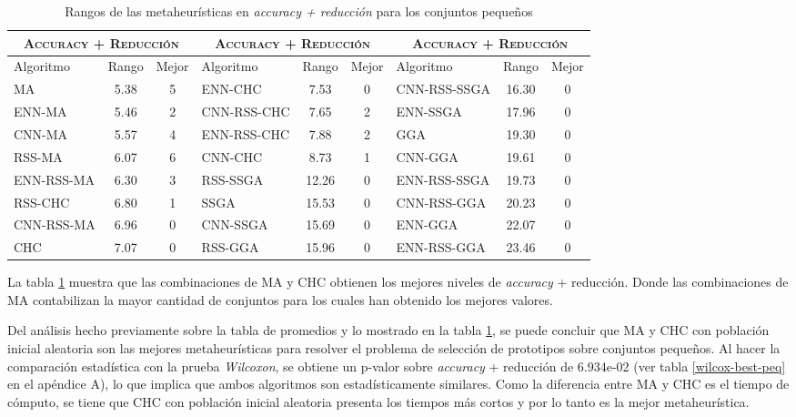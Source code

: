 \begin{table}[h!]
\centering
\begin{adjustbox}{max width =\textwidth}
\begin{tabular}{l c c|l c c|l c c}
\hline
\multicolumn{3}{c|}{\textsc{Accuracy + Reducción}}
	& \multicolumn{3}{c}{\textsc{Accuracy + Reducción}}
	& \multicolumn{3}{c}{\textsc{Accuracy + Reducción}} \\
\hline
Algoritmo & Rango & Mejor & Algoritmo & Rango & Mejor & Algoritmo & Rango & Mejor \\
\hline
\hline


MA           & 5.38  & 5 & ENN-CHC      & 7.53  & 0 & CNN-RSS-SSGA & 16.30 & 0  \\
ENN-MA       & 5.46  & 2 & CNN-RSS-CHC  & 7.65  & 2 & ENN-SSGA     & 17.96 & 0  \\
CNN-MA       & 5.57  & 4 & ENN-RSS-CHC  & 7.88  & 2 & GGA          & 19.30 & 0 \\
RSS-MA       & 6.07  & 6 & CNN-CHC      & 8.73  & 1 & CNN-GGA      & 19.61 & 0  \\
ENN-RSS-MA   & 6.30  & 3 & RSS-SSGA     & 12.26 & 0 & ENN-RSS-SSGA & 19.73 & 0  \\
RSS-CHC      & 6.80  & 1 & SSGA         & 15.53 & 0 & CNN-RSS-GGA  & 20.23 & 0  \\
CNN-RSS-MA   & 6.96  & 0 & CNN-SSGA     & 15.69 & 0 & ENN-GGA      & 22.07 & 0  \\
CHC          & 7.07  & 0 & RSS-GGA      & 15.96 & 0 & ENN-RSS-GGA  & 23.46 & 0 \\ 
 

\hline
\end{tabular}
\end{adjustbox}
\caption{Rangos de las metaheurísticas en \emph{accuracy + reducción} para los conjuntos pequeños}
\label{rank-peq}
\end{table} 

La tabla \ref{rank-peq} muestra que las combinaciones de MA y CHC obtienen los mejores niveles de \emph{accuracy} + reducción. Donde las combinaciones de MA contabilizan la mayor cantidad de conjuntos para los cuales han obtenido los mejores valores.

Del análisis hecho previamente sobre  la tabla de promedios y lo mostrado en la tabla \ref{rank-peq}, se puede concluir que MA y CHC con población inicial aleatoria son las mejores metaheurísticas para resolver el problema de selección de prototipos sobre conjuntos pequeños. Al hacer la comparación estadística con la prueba \emph{Wilcoxon}, se obtiene un p-valor sobre \emph{accuracy} + reducción de 6.934e-02 (ver tabla \ref{wilcox-best-peq} en el apéndice A), lo que implica que ambos algoritmos son estadísticamente similares. Como la diferencia entre MA y CHC es el tiempo de cómputo, se tiene que CHC con población inicial aleatoria presenta los tiempos más cortos y por lo tanto es la mejor metaheurística.



